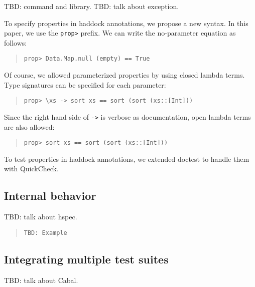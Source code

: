 \documentclass[preprint]{sigplanconf}
\begin{document}
TBD: command and library. 
TBD: talk about exception.

To specify properties in haddock annotations, we propose a new syntax. In this paper, we use the {\tt prop>} prefix. We can write the no-parameter equation as follows:

\begin{quote}
\begin{verbatim}
prop> Data.Map.null (empty) == True
\end{verbatim}
\end{quote}

\noindent Of course, we allowed parameterized properties by
using closed lambda terms.
Type signatures can be specified for each parameter:

\begin{quote}
\begin{verbatim}
prop> \xs -> sort xs == sort (sort (xs::[Int]))
\end{verbatim}
\end{quote}

\noindent Since the right hand side of {\tt ->} is verbose as documentation,
open lambda terms are also allowed:

\begin{quote}
\begin{verbatim}
prop> sort xs == sort (sort (xs::[Int]))
\end{verbatim}
\end{quote}

\noindent To test properties in haddock annotations, we extended doctest to handle
them with QuickCheck.

\subsection{Internal behavior}

TBD: talk about hspec.

\begin{quote}
\begin{verbatim}
TBD: Example
\end{verbatim}
\end{quote}

\subsection{Integrating multiple test suites}

TBD: talk about Cabal.
\end{document}
